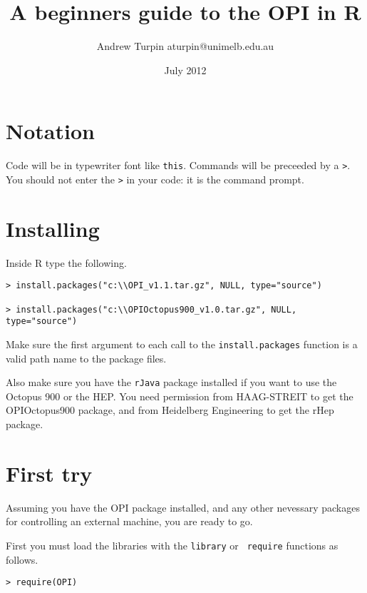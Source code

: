 \documentclass{article}
\title{A beginners guide to the OPI in R}
\date{July 2012}
\author{Andrew Turpin aturpin@unimelb.edu.au}
\begin{document}
\maketitle

\section{Notation}

Code will be in typewriter font like {\tt this}.
Commands will be preceeded by a {\tt >}. You should not enter the {\tt >} in your code: it is
the command prompt.

\section{Installing}
\label{sec-install}

Inside R type the following.

\begin{verbatim}
> install.packages("c:\\OPI_v1.1.tar.gz", NULL, type="source")

> install.packages("c:\\OPIOctopus900_v1.0.tar.gz", NULL, type="source")
\end{verbatim}

Make sure the first argument to each call to the {\tt install.packages}
function is a valid path name to the package files.

Also make sure you have the {\tt rJava} package installed if you
want to use the Octopus 900 or the HEP. You need permission from
HAAG-STREIT to get the OPIOctopus900 package, and from Heidelberg
Engineering to get the rHep package.




\section{First try}

Assuming you have the OPI package installed, and any other nevessary
packages for controlling an external machine, you are ready to go.

First you must load the libraries with the {\tt library} or {\tt
require} functions as follows.

\begin{verbatim}
> require(OPI)
\end{verbatim}
\end{document}
